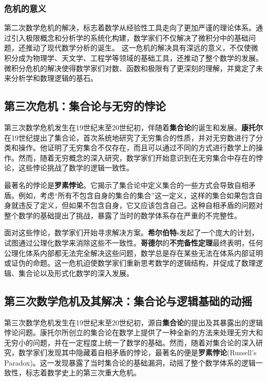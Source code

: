 \subsubsection{危机的意义}
第二次数学危机的解决，标志着数学从经验性工具走向了更加严谨的理论体系。通过引入极限概念和分析学的系统化构建，数学家们不仅解决了微积分中的基础问题，还推动了现代数学分析的诞生。
这一危机的解决具有深远的意义，不仅使微积分成为物理学、天文学、工程学等领域的基础工具，还推动了整个数学的发展。微积分危机的解决使得数学家们对数、函数和极限有了更深刻的理解，并奠定了未来分析学和数理逻辑的基石。

\subsection{第三次危机：集合论与无穷的悖论}

第三次数学危机发生在19世纪末至20世纪初，伴随着{\bf 集合论}的诞生和发展。{\bf 康托尔}在19世纪提出了集合论，首次系统地研究了无穷集合的性质，并对无穷数进行了分类和操作。他证明了无穷集合不仅存在，而且可以通过不同的方式进行数学上的操作。然而，随着无穷概念的深入研究，数学家们开始意识到在无穷集合中存在的悖论，这些悖论挑战了数学的逻辑一致性。

最著名的悖论是{\bf 罗素悖论}。它揭示了集合论中定义集合的一些方式会导致自相矛盾。例如，考虑“所有不包含自身的集合的集合”这一定义，这样的集合如果包含自身就违反了定义，但如果不包含自身，它又应该包含自己。这种自相矛盾的问题对整个数学的基础提出了挑战，暴露了当时的数学体系存在严重的不完整性。

面对这些悖论，数学家们开始寻求解决方案。{\bf 希尔伯特}s发起了一个庞大的计划，试图通过公理化数学来消除这些不一致性。{\bf 哥德尔}的{\bf 不完备性定理}最终表明，任何公理化体系内部都无法完全解决这些问题，数学总是存在某些无法在体系内部证明或证伪的命题。这一危机迫使数学家们重新思考数学的逻辑结构，并促成了数理逻辑、集合论以及形式化数学的深入发展。

\subsection{第三次数学危机及其解决：集合论与逻辑基础的动摇}

第三次数学危机发生在19世纪末至20世纪初，源自{\bf 集合论}的提出及其暴露出的逻辑悖论问题。康托尔所创立的集合论在数学上提供了一种全新的方法来处理无穷大和无穷小的问题，并在一定程度上统一了数学的基础。然而，随着对集合论的深入研究，数学家们发现其中隐藏着自相矛盾的悖论，最著名的便是{\bf 罗素悖论}(Russell’s Paradox)。这一发现暴露了当时集合论的基础漏洞，动摇了整个数学体系的逻辑一致性，标志着数学史上的第三次重大危机。

